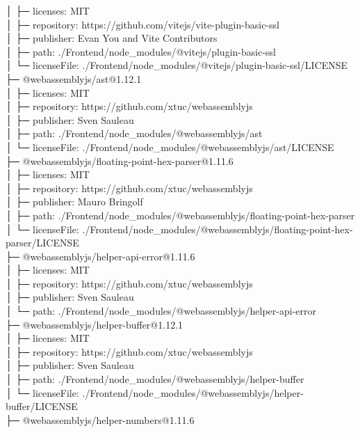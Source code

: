 │  ├─ licenses: MIT\\
│  ├─ repository: https://github.com/vitejs/vite-plugin-basic-ssl\\
│  ├─ publisher: Evan You and Vite Contributors\\
│  ├─ path: ./Frontend/node\_modules/@vitejs/plugin-basic-ssl\\
│  └─ licenseFile: ./Frontend/node\_modules/@vitejs/plugin-basic-ssl/LICENSE\\
├─ @webassemblyjs/ast@1.12.1\\
│  ├─ licenses: MIT\\
│  ├─ repository: https://github.com/xtuc/webassemblyjs\\
│  ├─ publisher: Sven Sauleau\\
│  ├─ path: ./Frontend/node\_modules/@webassemblyjs/ast\\
│  └─ licenseFile: ./Frontend/node\_modules/@webassemblyjs/ast/LICENSE\\
├─ @webassemblyjs/floating-point-hex-parser@1.11.6\\
│  ├─ licenses: MIT\\
│  ├─ repository: https://github.com/xtuc/webassemblyjs\\
│  ├─ publisher: Mauro Bringolf\\
│  ├─ path: ./Frontend/node\_modules/@webassemblyjs/floating-point-hex-parser\\
│  └─ licenseFile: ./Frontend/node\_modules/@webassemblyjs/floating-point-hex-parser/LICENSE\\
├─ @webassemblyjs/helper-api-error@1.11.6\\
│  ├─ licenses: MIT\\
│  ├─ repository: https://github.com/xtuc/webassemblyjs\\
│  ├─ publisher: Sven Sauleau\\
│  └─ path: ./Frontend/node\_modules/@webassemblyjs/helper-api-error\\
├─ @webassemblyjs/helper-buffer@1.12.1\\
│  ├─ licenses: MIT\\
│  ├─ repository: https://github.com/xtuc/webassemblyjs\\
│  ├─ publisher: Sven Sauleau\\
│  ├─ path: ./Frontend/node\_modules/@webassemblyjs/helper-buffer\\
│  └─ licenseFile: ./Frontend/node\_modules/@webassemblyjs/helper-buffer/LICENSE\\
├─ @webassemblyjs/helper-numbers@1.11.6\\
